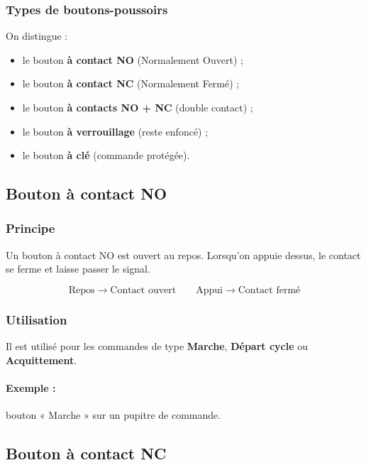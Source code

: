 \subsubsection{Types de boutons-poussoirs}

On distingue :

\begin{itemize}
    \item le bouton \textbf{à contact NO} (Normalement Ouvert) ;
    \item le bouton \textbf{à contact NC} (Normalement Fermé) ;
    \item le bouton \textbf{à contacts NO + NC} (double contact) ;
    \item le bouton \textbf{à verrouillage} (reste enfoncé) ;
    \item le bouton \textbf{à clé} (commande protégée).
\end{itemize}

\subsection{Bouton à contact NO}

\subsubsection{Principe}

Un bouton à contact NO est ouvert au repos. Lorsqu'on appuie dessus, le contact se ferme et laisse passer le signal.

\[
\text{Repos} \rightarrow \text{Contact ouvert}
\qquad
\text{Appui} \rightarrow \text{Contact fermé}
\]

\subsubsection{Utilisation}

Il est utilisé pour les commandes de type \textbf{Marche}, \textbf{Départ cycle} ou \textbf{Acquittement}.

\paragraph{Exemple :} bouton « Marche » sur un pupitre de commande.

\subsection{Bouton à contact NC}

